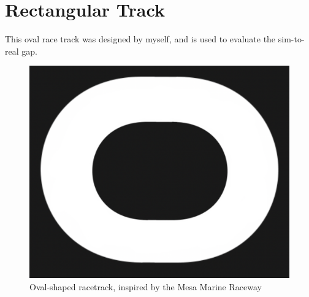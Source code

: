 \section{Rectangular Track}
This oval race track was designed by myself, and is used to evaluate the sim-to-real gap.
\begin{figure}[H]
\centering
\includegraphics[scale=0.3]{Figures/round.png}
\caption{Oval-shaped racetrack, inspired by the Mesa Marine Raceway}
\label{oval}
\end{figure}
